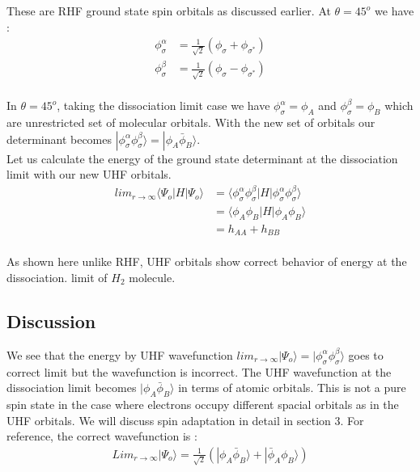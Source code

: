 \documentclass[11pt]{article}   	%
\begin{document}
	These are RHF ground state spin orbitals as discussed earlier. At $\theta=45^o$ we have :\\
	\begin{equation}
	\begin{split}
		\phi_{\sigma}^{\alpha}&=\frac{1}{\sqrt{2}}(\phi_{\sigma}+\phi_{\sigma^*})\\
		\phi_{\sigma}^{\beta}&=\frac{1}{\sqrt{2}}(\phi_{\sigma}-\phi_{\sigma^*})\\
	\end{split}
	\end{equation}
	
	In $\theta=45^o$, taking the dissociation limit case we have 
	$\phi_{\sigma}^{\alpha}=\phi_A$ and $\phi_{\sigma}^{\beta}=\phi_B$ which are unrestricted set of 
	molecular orbitals.
	With the new set of orbitals our determinant becomes $|\phi_{\sigma}^{\alpha}\phi_{\sigma}^{\beta}\rangle
	=|\phi_A\bar{\phi}_B\rangle$.\\ 
	
	Let us calculate the energy of the ground state determinant at the dissociation limit with our new UHF orbitals. \\
	\begin{equation}
		\begin{split}
			lim_{r\rightarrow \infty}\langle\Psi_o|H|\Psi_o\rangle&=\langle\phi_{\sigma}^{\alpha}
			\phi_{\sigma}^{\beta}|H|\phi_{\sigma}^{\alpha}\phi_{\sigma}^{\beta}\rangle\\
				&=\langle\phi_A\phi_B|H|\phi_A\phi_B\rangle\\
				&=h_{AA}+h_{BB}\\
		\end{split}
	\end{equation}
	
	As shown here unlike RHF, UHF orbitals show correct behavior of energy at the dissociation. 
	limit of $H_2$ molecule.\\
	\subsection{Discussion}
	We see that the energy by UHF wavefunction $lim_{r\rightarrow\infty}|\Psi_o\rangle=|\phi_{\sigma}^{\alpha}\phi_{\sigma}^{\beta}\rangle$ goes to
	correct limit but the wavefunction is incorrect. The UHF wavefunction at the dissociation limit
	 becomes $|\phi_A\bar{\phi}_B\rangle$ in terms of atomic orbitals. This is not a pure spin state in the case where electrons occupy
	 different spacial orbitals as in the UHF orbitals. We will discuss spin adaptation in detail in section 3.
	For reference, the correct wavefunction is :\\
	\begin{equation}
	\begin{split}
		Lim_{r\rightarrow\infty}|\Psi_o\rangle=\frac{1}{\sqrt{2}}(|\phi_A\bar{\phi}_B\rangle+|\bar{\phi}_A\phi_B\rangle)
	\end{split}
	\end{equation}
\end{document}
